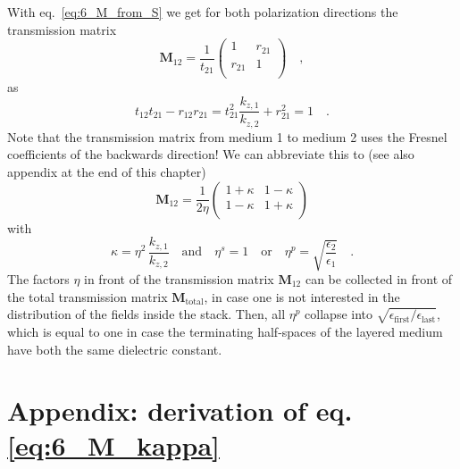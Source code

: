 With eq.~\ref{eq:6_M_from_S} we get for both polarization directions the transmission matrix
\begin{equation}
\mathbf{M}_{12} = \frac{1}{t_{21}} 
\begin{pmatrix}
1 & r_{21} \\ r_{21} & 1 \\
\end{pmatrix} \quad ,
\end{equation}
as 
\begin{equation}
t_{12} t_{21} - r_{12}r_{21} = t_{21}^2 \frac{k_{z,1}}{k_{z,2}} + r_{21}^2 = 1 \quad . 
\end{equation}
Note that the transmission matrix from medium 1 to medium 2 uses the Fresnel coefficients of the backwards direction!
We can abbreviate this to (see also appendix at the end of this chapter)
\begin{equation}
\mathbf{M}_{12} 
=\frac{ 1}{2 \eta }
\begin{pmatrix}
1 + \kappa & 1  -\kappa \\  1  - \kappa  & 1 + \kappa \\
\end{pmatrix} \label{eq:6_M_kappa}
\end{equation}
with 
\begin{equation}
\kappa = \eta^2 \,
\frac{  k_{z,1} }{ k_{z,2}}
\quad
\text{and}
\quad
\eta^s = 1 \quad \text{or} \quad \eta^p = \sqrt{ \frac{\epsilon_2}{\epsilon_1} } \quad . 
\end{equation}
The factors $\eta$ in front of the transmission matrix $\mathbf{M}_{12} $ can be collected in front of the total transmission matrix $\mathbf{M}_\text{total}$, in case one is not interested in the distribution of the fields inside the stack. Then, all $\eta^p$ collapse into $\sqrt{\epsilon_\text{first} / \epsilon_\text{last}}$, which is equal to one in case the terminating half-spaces of the layered medium have both the same dielectric constant. 



\section{Appendix: derivation of eq. \ref{eq:6_M_kappa}}


